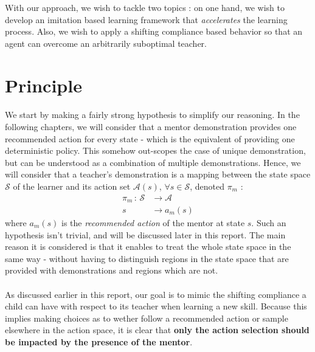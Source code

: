 \documentclass[a4paper]{report}
\begin{document}
	{
		 With our approach, we wish to tackle two topics : on one hand, we wish to develop an imitation based learning framework that \emph{accelerates} the learning process. Also, we wish to apply a shifting compliance based behavior so that an agent can overcome an arbitrarily suboptimal teacher.
		
		\section{Principle}
		{
			\paragraph{} We start by making a fairly strong hypothesis to simplify our reasoning. In the following chapters, we will consider that a mentor demonstration provides one recommended action for every state - which is the equivalent of providing one deterministic policy. This somehow out-scopes the case of unique demonstration, but can be understood as a combination of multiple demonstrations.\newline
			Hence, we will consider that a teacher's demonstration is a mapping between the state space $\mathcal{S}$ of the learner and its action set $\mathcal{A}(s)$, $\forall s\in\mathcal{S}$, denoted $\pi_m$ : 
			\begin{equation}
				\begin{aligned}
					\pi_m \, :  \, \mathcal{S} &\to \mathcal{A}\\
						     s &\to a_m(s) 
				\end{aligned}
			\end{equation}
			where $a_m(s)$ is the \emph{recommended action} of the mentor at state $s$. 
			\newline 
			Such an hypothesis isn't trivial, and will be discussed later in this report. The main reason it is considered is that it enables to treat the whole state space in the same way - without having to distinguish regions in the state space that are provided with demonstrations and regions which are not. 
			
			\paragraph{} As discussed earlier in this report, our goal is to mimic the shifting compliance a child can have with respect to its teacher when learning a new skill. Because this implies making choices as to wether follow a recommended action or sample elsewhere in the action space, it is clear that \textbf{only the action selection  should be impacted by the presence of the mentor}. 

}}
\end{document}

